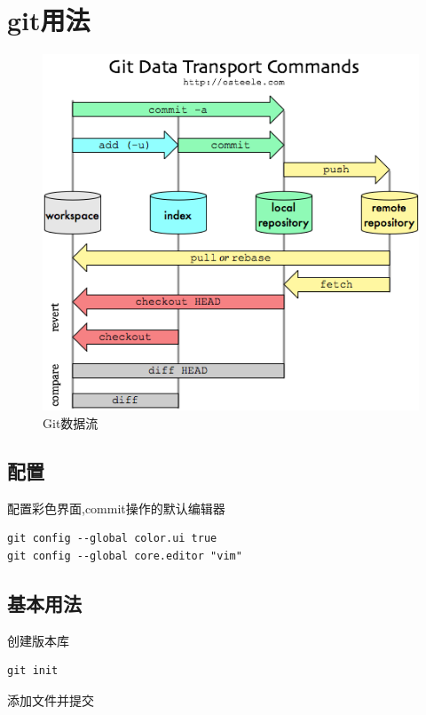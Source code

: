 
\section{git用法}

\begin{figure}[htpb]
    \begin{center}
        \includegraphics[keepaspectratio,width=0.5\paperwidth]{Pictures/git_dataflow.png}
    \end{center}
    \caption{Git数据流}
\end{figure}

\subsection{配置}
配置彩色界面,commit操作的默认编辑器
\begin{verbatim}
git config --global color.ui true
git config --global core.editor "vim"
\end{verbatim}

\subsection{基本用法}
创建版本库

\begin{verbatim}
git init
\end{verbatim}

添加文件并提交

